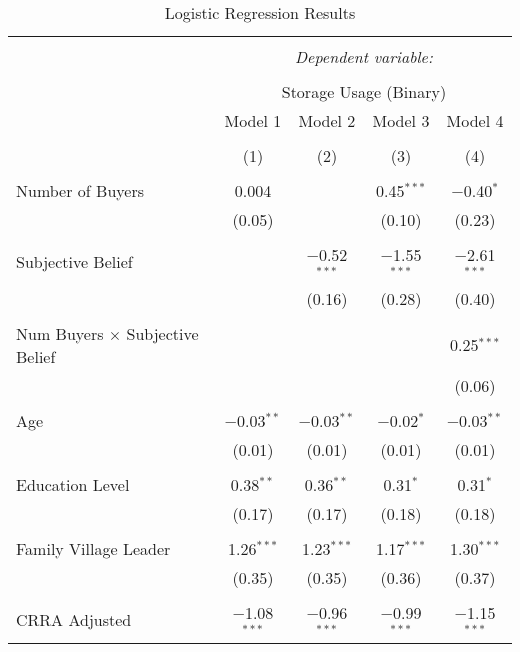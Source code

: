 
\begin{table}[!htbp] \centering 
  \caption{Logistic Regression Results} 
  \label{tab: binary storage ~ buyers' competition at harvest} 
\footnotesize 
\begin{tabular}{@{\extracolsep{5pt}}lcccc} 
\\[-1.8ex]\hline 
\hline \\[-1.8ex] 
 & \multicolumn{4}{c}{\textit{Dependent variable:}} \\ 
\cline{2-5} 
\\[-1.8ex] & \multicolumn{4}{c}{Storage Usage (Binary)} \\ 
 & Model 1 & Model 2 & Model 3 & Model 4 \\ 
\\[-1.8ex] & (1) & (2) & (3) & (4)\\ 
\hline \\[-1.8ex] 
 Number of Buyers & 0.004 &  & 0.45$^{***}$ & $-$0.40$^{*}$ \\ 
  & (0.05) &  & (0.10) & (0.23) \\ 
  & & & & \\ 
 Subjective Belief &  & $-$0.52$^{***}$ & $-$1.55$^{***}$ & $-$2.61$^{***}$ \\ 
  &  & (0.16) & (0.28) & (0.40) \\ 
  & & & & \\ 
   Num Buyers $\times$ Subjective Belief &  &  &  & 0.25$^{***}$ \\ 
  &  &  &  & (0.06) \\ 
  & & & & \\ 
 Age & $-$0.03$^{**}$ & $-$0.03$^{**}$ & $-$0.02$^{*}$ & $-$0.03$^{**}$ \\ 
  & (0.01) & (0.01) & (0.01) & (0.01) \\ 
  & & & & \\ 
 Education Level & 0.38$^{**}$ & 0.36$^{**}$ & 0.31$^{*}$ & 0.31$^{*}$ \\ 
  & (0.17) & (0.17) & (0.18) & (0.18) \\ 
  & & & & \\ 
 Family Village Leader & 1.26$^{***}$ & 1.23$^{***}$ & 1.17$^{***}$ & 1.30$^{***}$ \\ 
  & (0.35) & (0.35) & (0.36) & (0.37) \\ 
  & & & & \\ 
 CRRA Adjusted & $-$1.08$^{***}$ & $-$0.96$^{***}$ & $-$0.99$^{***}$ & $-$1.15$^{***}$ \\ 

\end{tabular}
\end{table}
